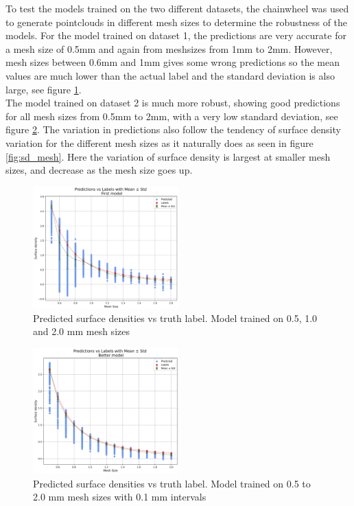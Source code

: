 To test the models trained on the two different datasets, the chainwheel was used to generate pointclouds in different mesh sizes to determine the robustness of the models. For the model trained on dataset 1, the predictions are very accurate for a mesh size of 0.5mm and again from meshsizes from 1mm to 2mm. However, mesh sizes between 0.6mm and 1mm gives some wrong predictions so the mean values are much lower than the actual label and the standard deviation is also large, see figure \ref{fig:pred_vs_label_first}.\\
The model trained on dataset 2 is much more robust, showing good predictions for all mesh sizes from 0.5mm to 2mm, with a very low standard deviation, see figure \ref{fig:pred_vs_label_better}. The variation in predictions also follow the tendency of surface density variation for the different mesh sizes as it naturally does as seen in figure \ref{fig:sd_mesh}. Here the variation of surface density is largest at smaller mesh sizes, and decrease as the mesh size goes up.

\begin{figure}[H]
    \centering
    \includegraphics[width=0.5\textwidth]{figures/predict_vs_label_first_lowQ.png}
    \caption{Predicted surface densities vs truth label. Model trained on 0.5, 1.0 and 2.0 mm mesh sizes}
    \label{fig:pred_vs_label_first}
\end{figure}

\begin{figure}[H]
    \centering
    \includegraphics[width=0.5\textwidth]{figures/predict_vs_label_better_lowQ.png}
    \caption{Predicted surface densities vs truth label. Model trained on 0.5 to 2.0 mm mesh sizes with 0.1 mm intervals}
    \label{fig:pred_vs_label_better}
\end{figure}

